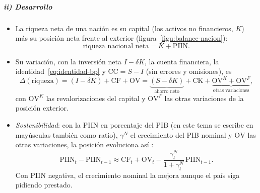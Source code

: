\documentclass[11pt]{article}
\begin{document}
\subparagraph{ii) Desarrollo}
\begin{itemize}
\item La riqueza neta de una nación es su capital (los activos no financieros, $K$) más su posición neta frente al exterior (figura~\ref{figu:balance-nacion}):
\begin{equation}\label{eq:riqueza}
\text{riqueza nacional neta}=K+\mathrm{PIIN} .
\end{equation}
\item Su variación, con la inversión neta $I-\delta K$, la cuenta financiera, la identidad~\eqref{eq:identidad-bp} y $\mathrm{CC}=S-I$ (sin errores y omisiones), es
\begin{equation}\label{eq:variacion-riqueza}
\Delta(\text{riqueza})=(I-\delta K)+\mathrm{CF}+\mathrm{OV}=\underbrace{(S-\delta K)}_{\text{ahorro neto}}+\mathrm{CK}+\underbrace{\mathrm{OV}^K+\mathrm{OV}^F}_{\text{otras variaciones}} ,
\end{equation}
con $\mathrm{OV}^K$ las revalorizaciones del capital y $\mathrm{OV}^F$ las otras variaciones de la posición exterior.
\item \emph{Sostenibilidad}: con la PIIN en porcentaje del PIB (en este tema se escribe en mayúsculas también como ratio), $\gamma^N$ el crecimiento del PIB nominal y $\mathrm{OV}$ las otras variaciones, la posición evoluciona así :
\begin{equation}\label{eq:dinamica-piin}
\mathrm{PIIN}_t-\mathrm{PIIN}_{t-1}\approx\mathrm{CF}_t+\mathrm{OV}_t-\frac{\gamma^N_t}{1+\gamma^N_t}\,\mathrm{PIIN}_{t-1} .
\end{equation}
Con PIIN negativa, el crecimiento nominal la mejora aunque el país siga pidiendo prestado.
\end{itemize}

\begin{infografia}[H]
\centering
\caption{El balance de la nación}\label{figu:balance-nacion}
\end{infografia}
\end{document}
